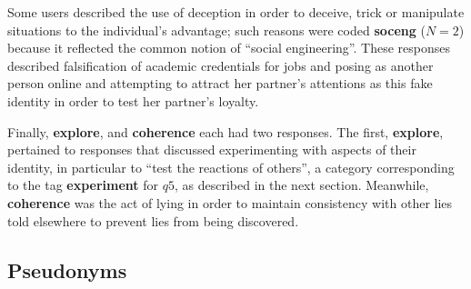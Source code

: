 \documentclass{sig-alternate}
\newcommand{\fig}[3][1.0]{
\begin{figure}[tbp]
\begin{center}
\texttt{[image: figs/\#2]}
\protect\caption{#3}
\label{fig:#2}
\end{center}
\end{figure}
}
\begin{document}
Some users described the use of deception in order to deceive, trick or manipulate situations to the individual's advantage; such reasons were coded \textbf{soceng} ($N=2$) because it reflected the common notion of ``social engineering''.  
These responses described falsification of academic credentials for jobs and posing as another person online and attempting to attract her partner's attentions as this fake identity in order to test her partner's loyalty.

Finally, \textbf{explore}, and \textbf{coherence} each had two responses.  The first, \textbf{explore}, pertained to responses that discussed experimenting with aspects of their identity, in particular to ``test the reactions of others'', a category corresponding to the tag \textbf{experiment} for $q5$, as described in the next section.  Meanwhile, \textbf{coherence} was the act of lying in order to maintain  consistency with other lies told elsewhere to prevent lies from being discovered. 






\subsection{Pseudonyms}
\label{sec:pseudonyms}
\end{document}
